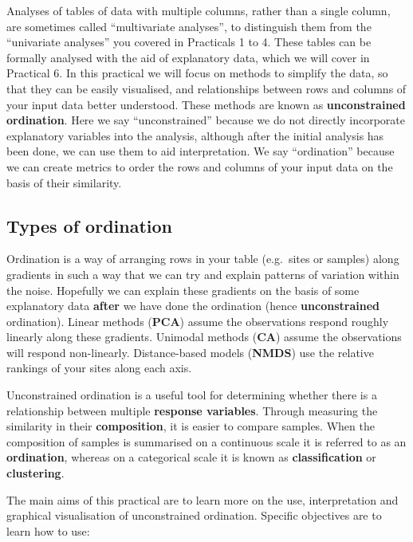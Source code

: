 \documentclass[
]{article}
\begin{document}
Analyses of tables of data with multiple columns, rather than a single
column, are sometimes called ``multivariate analyses'', to distinguish
them from the ``univariate analyses'' you covered in Practicals 1 to 4.
These tables can be formally analysed with the aid of explanatory data,
which we will cover in Practical 6. In this practical we will focus on
methods to simplify the data, so that they can be easily visualised, and
relationships between rows and columns of your input data better
understood. These methods are known as \textbf{unconstrained
ordination}. Here we say ``unconstrained'' because we do not directly
incorporate explanatory variables into the analysis, although after the
initial analysis has been done, we can use them to aid interpretation.
We say ``ordination'' because we can create metrics to order the rows
and columns of your input data on the basis of their similarity.

\hypertarget{types-of-ordination}{%
\subsection{Types of ordination}\label{types-of-ordination}}

Ordination is a way of arranging rows in your table (e.g.~sites or
samples) along gradients in such a way that we can try and explain
patterns of variation within the noise. Hopefully we can explain these
gradients on the basis of some explanatory data \textbf{after} we have
done the ordination (hence \textbf{unconstrained} ordination). Linear
methods (\textbf{PCA}) assume the observations respond roughly linearly
along these gradients. Unimodal methods (\textbf{CA}) assume the
observations will respond non-linearly. Distance-based models
(\textbf{NMDS}) use the relative rankings of your sites along each axis.

Unconstrained ordination is a useful tool for determining whether there
is a relationship between multiple \textbf{response variables}. Through
measuring the similarity in their \textbf{composition}, it is easier to
compare samples. When the composition of samples is summarised on a
continuous scale it is referred to as an \textbf{ordination}, whereas on
a categorical scale it is known as \textbf{classification} or
\textbf{clustering}.

The main aims of this practical are to learn more on the use,
interpretation and graphical visualisation of unconstrained ordination.
Specific objectives are to learn how to use:
\end{document}
